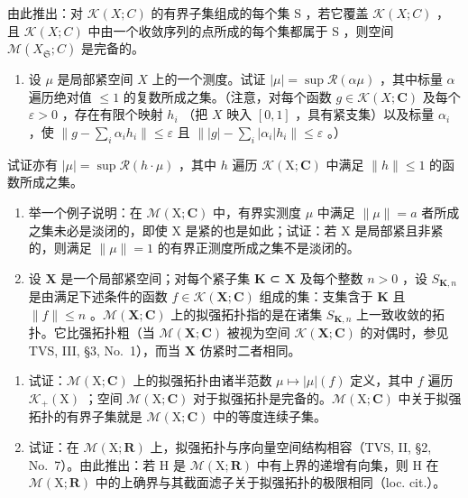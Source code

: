 由此推出：对 \(\mathcal{K}(X;C)\) 的有界子集组成的每个集 S ，若它覆盖 \(\mathcal{K}(X;C)\) ，且 \(\mathcal{K}(X;C)\) 中由一个收敛序列的点所成的每个集都属于 S ，则空间 \(\mathcal{M}(X_{\mathfrak{S}};C)\) 是完备的。

\begin{enumerate}
\def\labelenumi{\arabic{enumi})}
\setcounter{enumi}{5}
\tightlist
\item
  设 \(\mu\) 是局部紧空间 \(X\) 上的一个测度。试证 \(|\mu| = \sup \mathcal{R}(\alpha \mu)\) ，其中标量 \(\alpha\) 遍历绝对值 \(\leqslant 1\) 的复数所成之集。（注意，对每个函数 \(g \in \mathcal{K}(X; \mathbf{C})\) 及每个 \(\varepsilon > 0\) ，存在有限个映射 \(h_i\) （把 \(X\) 映入 \([0,1]\) ，具有紧支集）以及标量 \(\alpha_i\) ，使 \(\| g - \sum_{i} \alpha_i h_i \| \leqslant \varepsilon\) 且 \(\| |g| - \sum_{i} |\alpha_i| h_i \| \leqslant \varepsilon\) 。）
\end{enumerate}

试证亦有 \(|\mu| = \sup \mathcal{R}(h \cdot \mu)\) ，其中 \(h\) 遍历 \(\mathcal{K}(\mathrm{X};\mathbf{C})\) 中满足 \(\| h\| \leqslant 1\) 的函数所成之集。

\begin{enumerate}
\def\labelenumi{\arabic{enumi})}
\setcounter{enumi}{6}
\item
  举一个例子说明：在 \(\mathcal{M}(\mathrm{X};\mathbf{C})\) 中，有界实测度 \(\mu\) 中满足 \(\|\mu\|=a\) 者所成之集未必是淡闭的，即使 X 是紧的也是如此；试证：若 X 是局部紧且非紧的，则满足 \(\|\mu\|=1\) 的有界正测度所成之集不是淡闭的。
\item
  设 \(\mathbf{X}\) 是一个局部紧空间；对每个紧子集 \(\mathbf{K}\) ⊂ \(\mathbf{X}\) 及每个整数 \(n > 0\) ，设 \(S_{\mathbf{K},n}\) 是由满足下述条件的函数 \(f \in \mathcal{K}(\mathbf{X};\mathbf{C})\) 组成的集：支集含于 \(\mathbf{K}\) 且 \(\| f\| \leqslant n\) 。\(\mathcal{M}(\mathbf{X};\mathbf{C})\) 上的拟强拓扑指的是在诸集 \(S_{\mathbf{K},n}\) 上一致收敛的拓扑。它比强拓扑粗（当 \(\mathcal{M}(\mathbf{X};\mathbf{C})\) 被视为空间 \(\mathcal{K}(\mathbf{X};\mathbf{C})\) 的对偶时，参见 TVS, III, §3, No.~1），而当 \(\mathbf{X}\) 仿紧时二者相同。
\end{enumerate}

\begin{enumerate}
\def\labelenumi{\alph{enumi})}
\item
  试证：\(\mathcal{M}(\mathrm{X};\mathbf{C})\) 上的拟强拓扑由诸半范数 \(\mu \mapsto |\mu |(f)\) 定义，其中 \(f\) 遍历 \(\mathcal{K}_{+}(\mathrm{X})\) ；空间 \(\mathcal{M}(\mathrm{X};\mathbf{C})\) 对于拟强拓扑是完备的。\(\mathcal{M}(\mathrm{X};\mathbf{C})\) 中关于拟强拓扑的有界子集就是 \(\mathcal{M}(\mathrm{X};\mathbf{C})\) 中的等度连续子集。
\item
  试证：在 \(\mathcal{M}(\mathrm{X};\mathbf{R})\) 上，拟强拓扑与序向量空间结构相容（TVS, II, §2, No.~7）。由此推出：若 H 是 \(\mathcal{M}(\mathrm{X};\mathbf{R})\) 中有上界的递增有向集，则 H 在 \(\mathcal{M}(\mathrm{X};\mathbf{R})\) 中的上确界与其截面滤子关于拟强拓扑的极限相同（loc. cit.）。
\end{enumerate}

